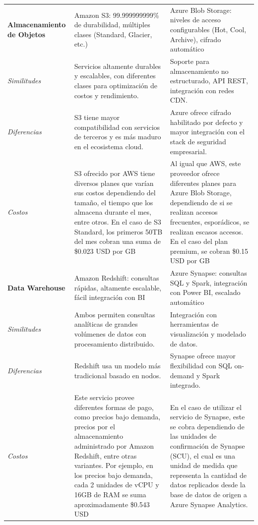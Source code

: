 \documentclass[12pt]{article}
\begin{document}
\begin{longtable}{|>{\RaggedRight\arraybackslash}p{4cm}|>{\RaggedRight\arraybackslash}p{5cm}|>{\RaggedRight\arraybackslash}p{5cm}|}
		\textbf{Almacenamiento de Objetos} & Amazon S3: 99.999999999\% de durabilidad, múltiples clases (Standard, Glacier, etc.) & Azure Blob Storage: niveles de acceso configurables (Hot, Cool, Archive), cifrado automático \\
		\textit{Similitudes} & Servicios altamente durables y escalables, con diferentes clases para optimización de costos y rendimiento. & Soporte para almacenamiento no estructurado, API REST, integración con redes CDN. \\
		\textit{Diferencias} & S3 tiene mayor compatibilidad con servicios de terceros y es más maduro en el ecosistema cloud. & Azure ofrece cifrado habilitado por defecto y mayor integración con el stack de seguridad empresarial. \\
		\textit{Costos} & S3 ofrecido por AWS tiene diversos planes que varían sus costos dependiendo del tamaño, el tiempo que los almacena durante el mes, entre otros. En el caso de S3 Standard, los primeros 50TB del mes cobran una suma de \$0.023 USD por GB & Al igual que AWS, este proveedor ofrece diferentes planes para Azure Blob Storage, dependiendo de si se realizan accesos frecuentes, esporádicos, se realizan escasos accesos. En el caso del plan premium, se cobran \$0.15 USD por GB \\
		\hline
		
		\textbf{Data Warehouse} & Amazon Redshift: consultas rápidas, altamente escalable, fácil integración con BI & Azure Synapse: consultas SQL y Spark, integración con Power BI, escalado automático \\
		\textit{Similitudes} & Ambos permiten consultas analíticas de grandes volúmenes de datos con procesamiento distribuido. & Integración con herramientas de visualización y modelado de datos. \\
		\textit{Diferencias} & Redshift usa un modelo más tradicional basado en nodos. & Synapse ofrece mayor flexibilidad con SQL on-demand y Spark integrado. \\
		\textit{Costos} & Este servicio provee diferentes formas de pago, como precios bajo demanda, precios por el almacenamiento administrado por Amazon Redshift, entre otras variantes. Por ejemplo, en los precios bajo demanda, cada 2 unidades de vCPU y 16GB de RAM se suma aproximadamente \$0.543 USD & En el caso de utilizar el servicio de Synapse, este se cobra dependiendo de las unidades de confirmación de Synapse (SCU), el cual es una unidad de medida que representa la cantidad de datos replicados desde la base de datos de origen a Azure Synapse Analytics. \\
		\hline
		

\end{longtable}
\end{document}
